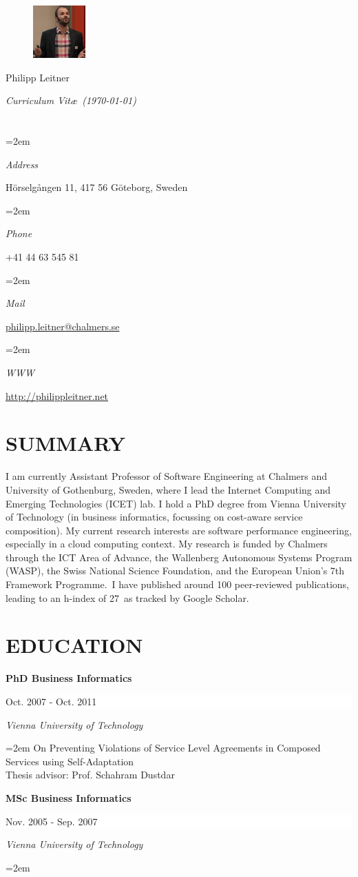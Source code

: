 \documentclass[paper=letter,fontsize=11pt]{scrartcl} %
\newlength{\spacebox}
\newcommand{\sepspace}{\vspace*{1em}}		%
\newcommand{\MyName}[1]{ %
		\Huge \usefont{OT1}{phv}{b}{n} \hfill #1
		\par \normalsize \normalfont}
\newcommand{\MySlogan}[1]{ %
		\large \usefont{OT1}{phv}{m}{n}\hfill \textit{#1}
		\par \normalsize \normalfont}
\newcommand{\NewPart}[2]{\section*{\uppercase{#1} #2}}
\newcommand{\PersonalEntry}[2]{
		\noindent\hangindent=2em\hangafter=0 %
		\parbox{\spacebox}{        %
		\textit{#1}}		       %
		\hspace{1.5em} #2 \par}    %
\newcommand{\EducationEntry}[4]{
		\noindent \textbf{#1} \hfill      %
		\colorbox{White}{%
			\parbox{10em}{%
			\hfill\color{Black}#2}} \par  %
		\noindent \textit{#3} \par        %
		\noindent\hangindent=2em\hangafter=0 \small #4 %
		\normalsize \par}
\begin{document}

\begin{figure}
	\vspace*{-2em}
		\includegraphics[width=0.18\textwidth]{profile.png}
\end{figure}

\MyName{Philipp Leitner}
\MySlogan{Curriculum Vit\ae\ (\today)}

\sepspace

\NewPart{}{}

\PersonalEntry{Address}{Hörselgången 11,
  417 56 Göteborg, Sweden}
\PersonalEntry{Phone}{+41 44 63 545 81}
\PersonalEntry{Mail}{\href{mailto:philipp.leitner@chalmers.se}{philipp.leitner@chalmers.se}}
\PersonalEntry{WWW}{\href{http://philippleitner.net}{http://philippleitner.net}}

\NewPart{Summary}{}
I am currently Assistant Professor of Software Engineering at Chalmers and University of Gothenburg, Sweden, where I lead the Internet Computing and Emerging Technologies (ICET) lab. I hold a PhD degree from Vienna University of Technology (in business informatics, focussing on cost-aware service composition). My current research interests are software performance engineering, especially in a cloud computing context. My research is funded by Chalmers through the ICT Area of Advance, the Wallenberg Autonomous Systems Program (WASP), the Swiss National Science Foundation, and the European Union's 7th Framework Programme. I have published around 100 peer-reviewed publications, leading to an h-index of 27 as tracked by Google Scholar.


\NewPart{Education}{}

\EducationEntry{PhD Business Informatics}{Oct. 2007 - Oct. 2011}{Vienna
University of Technology}{On Preventing Violations of Service Level Agreements in Composed Services using Self-Adaptation\\
Thesis advisor: Prof. Schahram Dustdar}
\sepspace

\EducationEntry{MSc Business Informatics}{Nov. 2005 - Sep. 2007}{Vienna
University of Technology}{}
\end{document}
